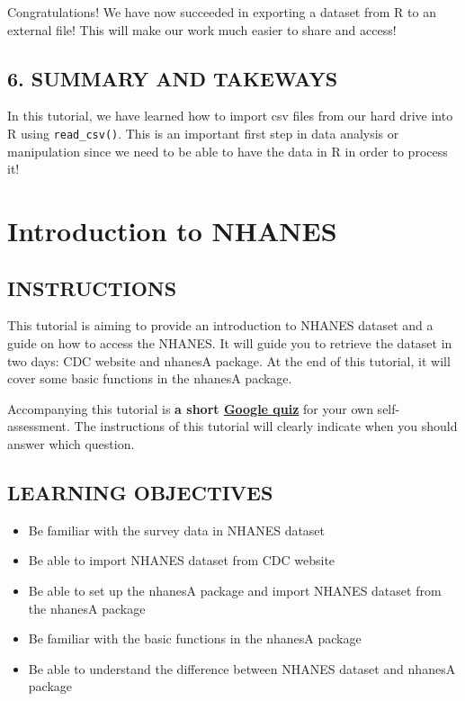 \documentclass[
]{book}
\begin{document}
Congratulations! We have now succeeded in exporting a dataset from R to an external file! This will make our work much easier to share and access!

\hypertarget{summary-and-takeways-1}{%
\section{6. SUMMARY AND TAKEWAYS}\label{summary-and-takeways-1}}

In this tutorial, we have learned how to import csv files from our hard drive into R using \texttt{read\_csv()}. This is an important first step in data analysis or manipulation since we need to be able to have the data in R in order to process it!

\hypertarget{introduction-to-nhanes}{%
\chapter{Introduction to NHANES}\label{introduction-to-nhanes}}

\hypertarget{instructions-3}{%
\section{INSTRUCTIONS}\label{instructions-3}}

This tutorial is aiming to provide an introduction to NHANES dataset and a guide on how to access the NHANES. It will guide you to retrieve the dataset in two days: CDC website and nhanesA package. At the end of this tutorial, it will cover some basic functions in the nhanesA package.

Accompanying this tutorial is \textbf{a short \href{https://forms.gle/zhMbsduL8xYjnmXg6}{Google quiz}} for your own self-assessment. The instructions of this tutorial will clearly indicate when you should answer which question.

\hypertarget{learning-objectives-3}{%
\section{LEARNING OBJECTIVES}\label{learning-objectives-3}}

\begin{itemize}
\item
  Be familiar with the survey data in NHANES dataset
\item
  Be able to import NHANES dataset from CDC website
\item
  Be able to set up the nhanesA package and import NHANES dataset from the nhanesA package
\item
  Be familiar with the basic functions in the nhanesA package
\item
  Be able to understand the difference between NHANES dataset and nhanesA package
\end{itemize}
\end{document}

